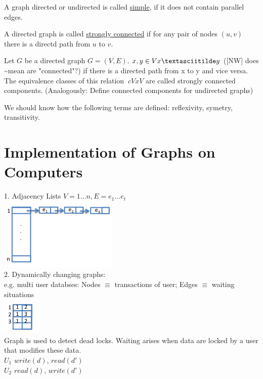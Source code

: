 \begin{definition}
    A graph directed or undirected is called \underline{simple}, if it does not contain parallel edges.
\end{definition}

\begin{definition}
        A directed graph is called \underline{strongly connected} if for any pair of nodes $(u,v)$ 
        there is a directd path from $u$ to $v$.
\end{definition}

Let $G$ be a directed graph $G = (V,E)$. $x,y \in V x \textasciitilde y$ ([NW] does \textasciitilde mean are "connected"?)
if there is a directed path from x to y and vice versa. \\

The equivalence classes of this relation $~c VxV$ are called strongly connected components.
(Analogously: Define connected components for undirected graphs)

\begin{information}
    We should know how the following terms are defined: reflexivity, symetry, transitivity.
\end{information}

\section{Implementation of Graphs on Computers}
1. Adjacency Lists $V = {1...n}, E = {e_{1}...e_{t}}$ \\
\includegraphics{diagrams/adjacency_list.png} \\
2. Dynamically changing graphs: \\
e.g. multi user databses: Nodes $\equiv$  transactions of user; Edges $\equiv$  waiting situations \\
\includegraphics{diagrams/dynamically_changing_graphs.png} \\
Graph is used to detect dead locks. Waiting arises when data are locked by a user that modifies these data. \\
$U_{1}$ $write(d)$, $read(d')$ \\
$U_{2}$ $read(d)$, $write(d')$


